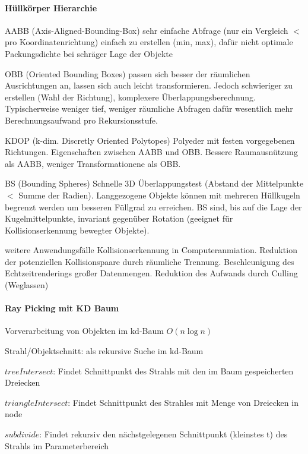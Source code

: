 \documentclass[landscape]{article}
\begin{document}
\begin{multicols}{3}
  \paragraph{Hüllkörper Hierarchie}
  \begin{description*}
    \item[AABB] (Axis-Aligned-Bounding-Box) sehr einfache Abfrage (nur ein Vergleich $<$ pro Koordinatenrichtung) einfach zu erstellen (min, max), dafür nicht optimale Packungsdichte bei schräger Lage der Objekte
    \item[OBB] (Oriented Bounding Boxes) passen sich besser der räumlichen Ausrichtungen an, lassen sich auch leicht transformieren. Jedoch schwieriger zu erstellen (Wahl der Richtung), komplexere Überlappungsberechnung. Typischerweise weniger tief, weniger räumliche Abfragen dafür wesentlich mehr Berechnungsaufwand pro Rekursionsstufe.
    \item[KDOP] (k-dim. Discretly Oriented Polytopes) Polyeder mit festen vorgegebenen Richtungen. Eigenschaften zwischen AABB und OBB. Bessere Raumausnützung als AABB, weniger Transformationene als OBB.
    \item[BS] (Bounding Spheres) Schnelle 3D Überlappungstest (Abstand der Mittelpunkte $<$ Summe der Radien). Langgezogene Objekte können mit mehreren Hüllkugeln begrenzt werden um besseren Füllgrad zu erreichen. BS sind, bis auf die Lage der Kugelmittelpunkte, invariant gegenüber Rotation (geeignet für Kollisionserkennung bewegter Objekte).
    \item[weitere Anwendungsfälle] Kollisionserkennung in Computeranmiation. Reduktion der potenziellen Kollisionspaare durch räumliche Trennung. Beschleunigung des Echtzeitrenderings großer Datenmengen. Reduktion des Aufwands durch Culling (Weglassen)
  \end{description*}
  
  \paragraph{Ray Picking mit KD Baum}
  \begin{itemize*}
    \item Vorverarbeitung von Objekten im kd-Baum $O(n \log n)$
    \item Strahl/Objektschnitt: als rekursive Suche im kd-Baum
    \item $treeIntersect$: Findet Schnittpunkt des Strahls mit den im Baum gespeicherten Dreiecken
    \item $triangleIntersect$: Findet Schnittpunkt des Strahles mit Menge von Dreiecken in node
    \item $subdivide$: Findet rekursiv den nächstgelegenen Schnittpunkt (kleinstes t) des Strahls im Parameterbereich 
  \end{itemize*}
  

\end{multicols}
\end{document}
